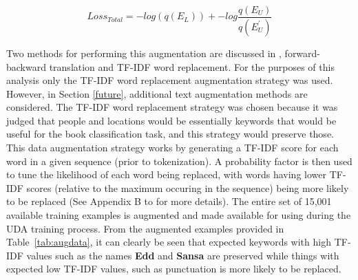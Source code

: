 \documentclass[twoside,twocolumn,10pt]{article}
\begin{document}
 \begin{equation}
 \label{eq:loss}
 Loss_{Total} = -log(q(E_{L})) + -log\frac{q(E_{U})}{q(E^{\prime}_{U})}
 \end{equation}

Two methods for performing this augmentation are discussed in \cite{Xie:2019}, forward-backward translation and TF-IDF word replacement. For the purposes of this analysis only the TF-IDF word replacement augmentation strategy was used. However, in Section \ref{future}, additional text augmentation methods are considered. The TF-IDF word replacement strategy was chosen because it was judged that people and locations would be essentially keywords that would be useful for the book classification task, and this strategy would preserve those. This data augmentation strategy works by generating a TF-IDF score for each word in a given sequence (prior to tokenization). A probability factor is then used to tune the likelihood of each word being replaced, with words having lower TF-IDF scores (relative to the maximum occuring in the sequence) being more likely to be replaced (See Appendix B to \cite{Xie:2019} for more details).  The entire set of  15,001 available training examples is augmented and made available for using during the UDA training process. From the augmented examples provided in Table~\ref{tab:augdata}, it can clearly be seen that expected keywords with high TF-IDF values such as the names \textbf{Edd} and \textbf{Sansa} are preserved while things with expected low TF-IDF values, such as punctuation is more likely to be replaced.  
\end{document}
